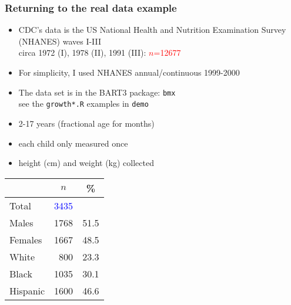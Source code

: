 \documentclass[11pt,dvipsnames,usenames,times]{beamer}
\newcommand*{\red}[1]{\textcolor{red}{#1}}%
\newcommand*{\blue}[1]{\textcolor{blue}{#1}}%
\begin{document}
\begin{comment}
\begin{frame}\frametitle{\bf\textcolor{blue}{Friedman's partial dependence function (FPD)} and\\
\textcolor{red}{Marginal Effects of Dependent Variables}: subset method}

Suppose for one setting, $x_{ik}$, we have an increasing grid of values\\
$-\infty=\tilde{x}_{0} < \tilde{x}_{1} < \tilde{x}_{2} < \dots < 
\tilde{x}_{J} < \tilde{x}_{J+1}=\infty$
\begin{align*}
f_{\textcolor{red}{S}}(\textcolor{red}{\bm{x}_{S_{-k}}, \tilde{x}_{j}})
& \equiv K^{-1} \sum_{\{i: \tilde{x}_{j-1} <x_{ik} < \tilde{x}_{j+1}\}} f(\textcolor{red}{\bm{x}_{S_{-k}}, \tilde{x}_{j}}, {\bm{x}_{iC}}) \\
& \where K=\sum_i \I{\tilde{x}_{j-1} <x_{ik} < \tilde{x}_{j+1}}
\end{align*}

\end{frame}
\end{comment}

\begin{frame}\frametitle{Returning to the real data example}
\begin{itemize}
\item CDC's data is the US National Health 
and Nutrition Examination Survey (NHANES) waves I-III\\ 
circa 1972 (I), 1978 (II), 1991 (III): \red{$n$=12677}
\item For simplicity, I used NHANES annual/continuous 1999-2000 
\item The data set is in the BART3 package: \texttt{bmx}\\
see the \texttt{growth*.R} examples in \texttt{demo}
\item 2-17 years (fractional age for months)
\item each child only measured once
\item height (cm) and weight (kg) collected
\end{itemize} 
\vspace*{-2mm}
\begin{center}
\begin{tabular}{l|rr}
        & \multicolumn{1}{|c}{$n$} & \multicolumn{1}{c}{\%} \\ \hline 
Total   & \blue{3435} \\ \hline
Males   & 1768 & 51.5 \\
Females & 1667 & 48.5 \\ \hline
White   &  800 & 23.3 \\
Black   & 1035 & 30.1 \\
Hispanic& 1600 & 46.6 
\end{tabular}
\end{center}
\end{frame}
\end{document}
